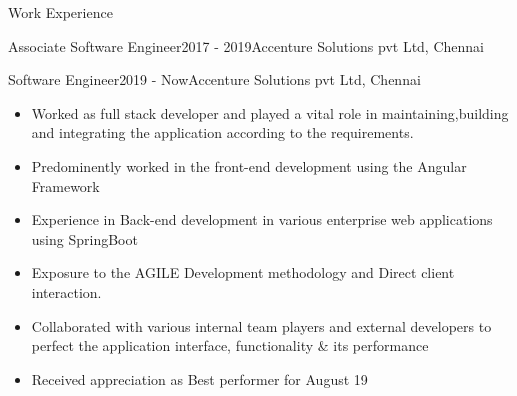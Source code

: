 \documentclass{resume} %
\begin{document}

\begin{rSection}{Work Experience}
\begin{rSubsection}{Associate Software Engineer}{2017 - 2019}{Accenture Solutions pvt Ltd, Chennai}{}
\end{rSubsection}
\begin{rSubsection}{Software Engineer}{2019 - Now}{Accenture Solutions pvt Ltd, Chennai}{}
\end{rSubsection}
\begin{itemize}
    \item Worked as full stack developer and played a vital role in maintaining,building and integrating the application according to the requirements.
    \item Predominently worked in the front-end development using the Angular Framework 
    \item Experience in Back-end development in various enterprise web applications using SpringBoot
    \item Exposure to the AGILE Development methodology and Direct client interaction.
    \item Collaborated with various internal team players and external developers to perfect the application interface, functionality \& its performance
    \item Received appreciation as Best performer for August 19
\end{itemize}

\end{rSection}
\end{document}
